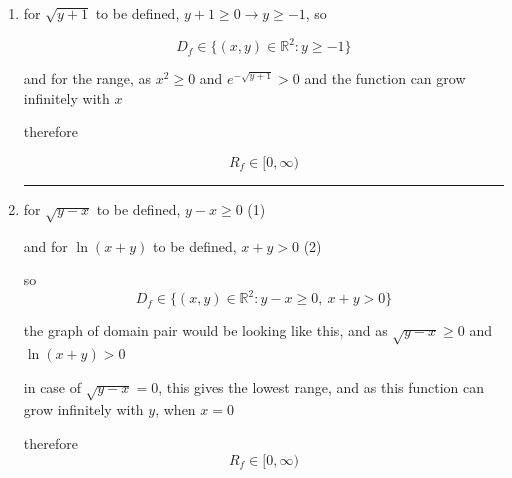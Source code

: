 \documentclass{article}
\theoremstyle{remark}
\begin{document}
\begin{enumerate}[label=(\alph*)]
    \item for $\sqrt{y+1}$ to be defined, $y+1 \ge 0 \to y \ge -1$, so 

    \[
    \boxed{D_f \in \{(x,y)\in \mathbb{R}^2 : y \ge -1\}}
    \]

    and for the range, as $x^2 \ge 0$ and $e^{-\sqrt{y+1}} > 0$ and the function can grow infinitely with $x$

    therefore 

    \[
    \boxed{R_f \in [0,\infty)}
    \]

    \medskip
    \begin{center}
    \rule{0.3\linewidth}{0.2pt}
    \end{center}
    \medskip


    \item for $\sqrt{y-x}$ to be defined, $y-x \ge 0$ \hfill (1)

    and for $\ln(x+y)$ to be defined, $x+y > 0$ \hfill (2)

    so \[
    \boxed{D_f \in \{(x,y)\in \mathbb{R}^2 : y-x \ge 0,\ x+y > 0\}}
    \]

    \begin{center}
    \end{center}

    the graph of domain pair would be looking like this, and as $\sqrt{y-x} \ge 0$ and $\ln(x+y) > 0$

    in case of $\sqrt{y-x} = 0$, this gives the lowest range, and as this function can grow infinitely with $y$, when $x=0$

    therefore \[
    \boxed{R_f \in [0,\infty)}
    \]
\end{enumerate}
\end{document}

